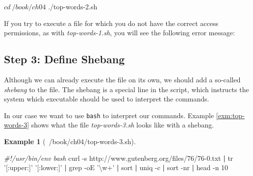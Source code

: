 \documentclass[
]{book}
\newenvironment{Shaded}{\begin{snugshade}}{\end{snugshade}}
\newcommand{\BuiltInTok}[1]{#1}
\newcommand{\CommentTok}[1]{\textcolor[rgb]{0.56,0.35,0.01}{\textit{#1}}}
\newcommand{\ExtensionTok}[1]{#1}
\newcommand{\FunctionTok}[1]{\textcolor[rgb]{0.00,0.00,0.00}{#1}}
\newcommand{\KeywordTok}[1]{\textcolor[rgb]{0.13,0.29,0.53}{\textbf{#1}}}
\newcommand{\NormalTok}[1]{#1}
\newcommand{\StringTok}[1]{\textcolor[rgb]{0.31,0.60,0.02}{#1}}
\theoremstyle{definition}
\theoremstyle{definition}
\newtheorem{example}{Example}[chapter]
\theoremstyle{definition}
\theoremstyle{remark}
\begin{document}
\begin{Shaded}
\begin{Highlighting}[]
\NormalTok{$ }\BuiltInTok{cd}\NormalTok{ ~/book/ch04}
\NormalTok{$ }\ExtensionTok{./top-words-2.sh}
\end{Highlighting}
\end{Shaded}

If you try to execute a file for which you do not have the correct access permissions, as with \emph{top-words-1.sh}, you will see the following error message:

\begin{Shaded}
\end{Shaded}

\hypertarget{step-3-define-shebang}{%
\subsection{Step 3: Define Shebang}\label{step-3-define-shebang}}

Although we can already execute the file on its own, we should add a so-called \emph{shebang} to the file. The shebang is a special line in the script, which instructs the system which executable should be used to interpret the commands.

In our case we want to use \texttt{bash} to interpret our commands. Example \ref{exm:top-words-3} shows what the file \emph{top-words-3.sh} looks like with a shebang.

\begin{example}[~/book/ch04/top-words-3.sh]
\protect\hypertarget{exm:top-words-3}{}{\label{exm:top-words-3} {} }
\end{example}

\begin{Shaded}
\begin{Highlighting}[]
\CommentTok{#!/usr/bin/env bash}
\ExtensionTok{curl}\NormalTok{ -s http://www.gutenberg.org/files/76/76-0.txt }\KeywordTok{|}
\FunctionTok{tr} \StringTok{'[:upper:]'} \StringTok{'[:lower:]'} \KeywordTok{|} \FunctionTok{grep}\NormalTok{ -oE }\StringTok{'\textbackslash{}w+'} \KeywordTok{|} \FunctionTok{sort} \KeywordTok{|}
\FunctionTok{uniq}\NormalTok{ -c }\KeywordTok{|} \FunctionTok{sort}\NormalTok{ -nr }\KeywordTok{|} \FunctionTok{head}\NormalTok{ -n 10}
\end{Highlighting}
\end{Shaded}
\end{document}
